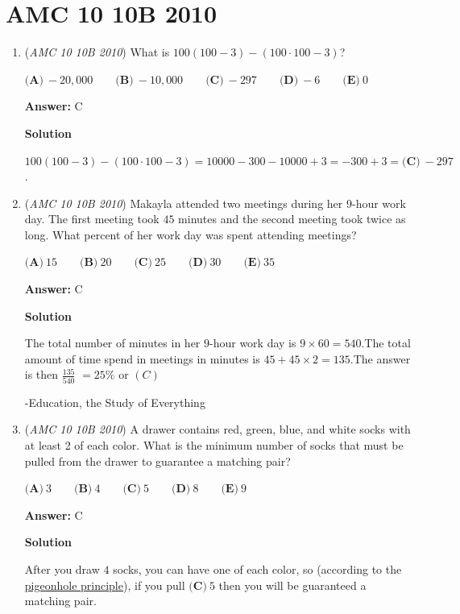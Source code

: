 \section{AMC 10 10B 2010}
        \begin{enumerate}
        	\item (\textit{AMC 10 10B 2010}) What is $100(100-3)-(100\cdot100-3)$?


 $\textbf{(A)}\ -20,000 \qquad \textbf{(B)}\ -10,000 \qquad \textbf{(C)}\ -297 \qquad \textbf{(D)}\ -6 \qquad \textbf{(E)}\ 0$

 \textbf{Answer: }C



\textbf{Solution}

$100(100-3)-(100\cdot{100}-3)=10000-300-10000+3=-300+3=\boxed{\textbf{(C)}\ -297}$.

 


	\item (\textit{AMC 10 10B 2010}) Makayla attended two meetings during her $9$-hour work day. The first meeting took $45$ minutes and the second meeting took twice as long. What percent of her work day was spent attending meetings?


 $\textbf{(A)}\ 15 \qquad \textbf{(B)}\ 20 \qquad \textbf{(C)}\ 25 \qquad \textbf{(D)}\ 30 \qquad \textbf{(E)}\ 35$

 \textbf{Answer: }C



\textbf{Solution}

The total number of minutes in her $9$-hour work day is $9 \times 60 = 540.$The total amount of time spend in meetings in minutes is $45 + 45 \times 2 = 135.$The answer is then $\frac{135}{540}$ $= \boxed{25\%}$ or  $\boxed{(C)}$

 -Education, the Study of Everything

 


	\item (\textit{AMC 10 10B 2010}) A drawer contains red, green, blue, and white socks with at least 2 of each color. What is
the minimum number of socks that must be pulled from the drawer to guarantee a matching
pair?


 $\textbf{(A)}\ 3 \qquad \textbf{(B)}\ 4 \qquad \textbf{(C)}\ 5 \qquad \textbf{(D)}\ 8 \qquad \textbf{(E)}\ 9$

 \textbf{Answer: }C



\textbf{Solution}

After you draw $4$ socks, you can have one of each color, so (according to the \href{https://artofproblemsolving.com/wiki/index.php?title=Pigeonhole\_principle}{pigeonhole principle}), if you pull $\boxed{\textbf{(C)}\ 5}$ then you will be guaranteed a matching pair.


\end{enumerate}
